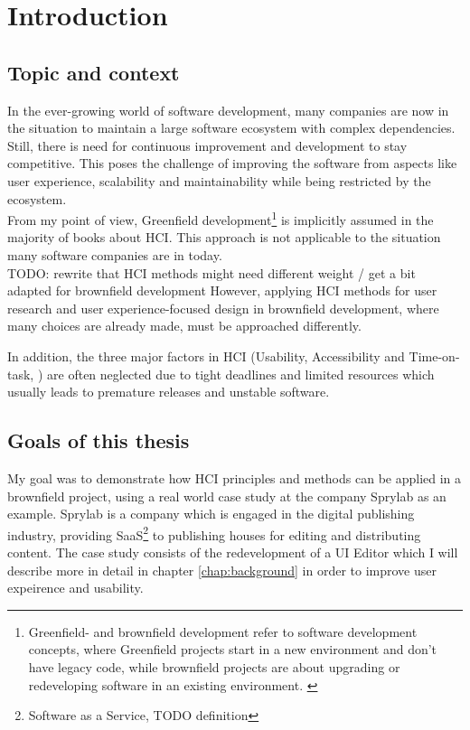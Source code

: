 %
\chapter{Introduction}
\label{chap:introduction}

\section{Topic and context}

In the ever-growing world of software development, many companies are now in the situation to maintain a large software ecosystem with complex dependencies.
Still, there is need for continuous improvement and development to stay competitive.
This poses the challenge of improving the software from aspects like user experience, scalability and maintainability while being restricted by the ecosystem.
\\
From my point of view, Greenfield development\footnote{Greenfield- and brownfield development refer to software development concepts, where Greenfield projects start in a new environment and don't have legacy code, while brownfield projects are about upgrading or redeveloping software in an existing environment. \cite{JohnAdamsIt:Greenfield}} is implicitly assumed in the majority of books about HCI.
This approach is not applicable to the situation many software companies are in today.
\\
TODO: rewrite that HCI methods might need different weight / get a bit adapted for brownfield development
However, applying HCI methods for user research and user experience-focused design in brownfield development, where many choices are already made, must be approached differently.

In addition, the three major factors in HCI (Usability, Accessibility and Time-on-task, \Cite[pp. 38-40]{LearnHCI:2020ys}) are often neglected due to tight deadlines and limited resources which usually leads to premature releases and unstable software.
\section{Goals of this thesis}
My goal was to demonstrate how HCI principles and methods can be applied in a brownfield project, using a real world case study at the company Sprylab as an example.
Sprylab is a company which is engaged in the digital publishing industry, providing SaaS\footnote{Software as a Service, TODO definition} to publishing houses for editing and distributing content.
The case study consists of the redevelopment of a UI Editor which I will describe more in detail in chapter \ref{chap:background} in order to improve user expeirence and usability.

